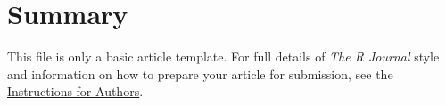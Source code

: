 \section{Summary}

This file is only a basic article template. For full details of \emph{The R Journal} style and information on how to prepare your article for submission, see the \href{https://journal.r-project.org/share/author-guide.pdf}{Instructions for Authors}.



\address{Jaros\l{}aw Chilmoniuk\\
  Affiliation\\
  Address\\
  Country\\
  (ORCiD if desired)\\
  }

\address{Madeleine Ruhe\\
  Brandenburg University of Technology Cottbus - Senftenberg\\
  Universit\"atsplatz 1, Senftenberg\\
  Germany\\
  (ORCiD if desired)\\
  }

\address{Stefan R\"{o}diger\\
  Brandenburg University of Technology Cottbus - Senftenberg\\
  Universit\"atsplatz 1, Senftenberg\\
  Germany\\
  (ORCiD: 0000-0002-1441-6512)\\
  }

\address{Micha\l{} Burdukiewicz\\
  Affiliation\\
  Address\\
  Country\\
  (ORCiD: 0000-0001-8926-582X)\\
  }
